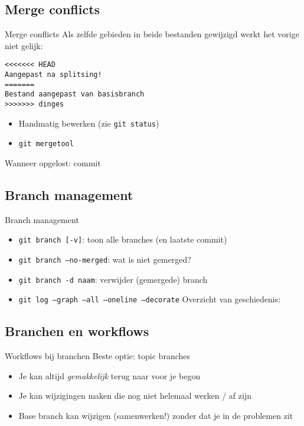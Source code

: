 \subsection{Merge conflicts}
\begin{frame}[fragile]{Merge conflicts}
	Als zelfde gebieden in beide bestanden gewijzigd werkt het vorige niet gelijk:
	\begin{verbatim}
<<<<<<< HEAD
Aangepast na splitsing!
=======
Bestand aangepast van basisbranch
>>>>>>> dinges
	\end{verbatim}
	\begin{itemize}
		\item Handmatig bewerken (zie \texttt{git status})
		\item \texttt{git mergetool}
	\end{itemize}
	Wanneer opgelost: commit
\end{frame}

\subsection{Branch management}
\begin{frame}{Branch management}
	\begin{itemize}
		\item \texttt{git branch [-v]}: toon alle branches (en laatste commit)
		\item \texttt{git branch --no-merged}: wat is niet gemerged?
		\item \texttt{git branch -d naam}: verwijder (gemergede) branch
		\item \texttt{git log --graph --all --oneline --decorate} Overzicht van geschiedenis:
	\end{itemize}
\end{frame}

\subsection{Branchen en workflows}
\begin{frame}{Workflows bij branchen}
	\alert{Beste optie: topic branches}
	\begin{itemize}
		\item Je kan altijd \emph{gemakkelijk} terug naar voor je begon
		\item Je kan wijzigingen maken die nog niet helemaal werken / af zijn
		\item Base branch kan wijzigen (samenwerken!) zonder dat je in de problemen zit
	\end{itemize}
\end{frame}
